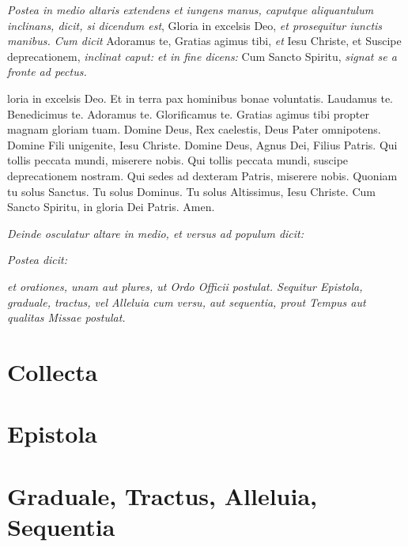 \textit{Postea in medio altaris extendens et iungens manus, caputque
aliquantulum inclinans, dicit, si dicendum est}, Gloria in excelsis Deo,
\textit{et prosequitur iunctis manibus.  Cum dicit} Adoramus te, Gratias agimus
tibi, \textit{et} Iesu Christe, et Suscipe deprecationem, \textit{inclinat
caput: et in fine dicens:} Cum Sancto Spiritu, \textit{signat se a fronte ad
pectus.}


loria in excelsis Deo.  Et in terra pax hominibus bonae voluntatis.
Laudamus te.  Benedicimus te.   Adoramus te.  Glorificamus
te.   Gratias agimus tibi propter magnam gloriam tuam.
Domine Deus, Rex caelestis, Deus Pater omnipotens.  Domine Fili unigenite,
 Iesu Christe.  Domine Deus, Agnus Dei, Filius Patris.  Qui
tollis peccata mundi, miserere nobis.  Qui tollis peccata mundi,
 suscipe deprecationem nostram.  Qui sedes ad dexteram
Patris, miserere nobis.  Quoniam tu solus Sanctus.  Tu solus Dominus.  Tu solus
Altissimus,  Iesu Christe.  \cross{} Cum Sancto Spiritu, in
gloria Dei Patris.  Amen.

\textit{Deinde osculatur altare in medio, et versus ad populum dicit:}


\textit{Postea dicit:}


\textit{%
    et orationes, unam aut plures, ut Ordo Officii postulat.  Sequitur Epistola,
    graduale, tractus, vel Alleluia cum versu, aut sequentia, prout Tempus aut
    qualitas Missae postulat.
}

\section{Collecta}


\section{Epistola}



\section{Graduale, Tractus, Alleluia, Sequentia}

